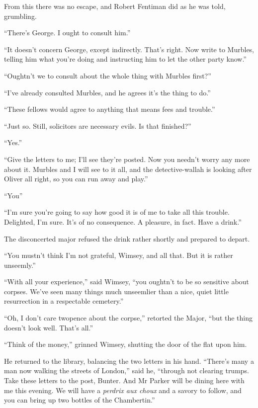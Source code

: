 From this there was no escape, and Robert Fentiman did as he was told, grumbling.

\enquote{There's George. I ought to consult him.}

\enquote{It doesn't concern George, except indirectly. That's right. Now write to Murbles, telling him what you're doing and instructing him to let the other party know.}

\enquote{Oughtn't we to consult about the whole thing with Murbles first?}

\enquote{I've already consulted Murbles, and he agrees it's the thing to do.}

\enquote{These fellows would agree to anything that means fees and trouble.}

\enquote{Just so. Still, solicitors are necessary evils. Is that finished?}

\enquote{Yes.}

\enquote{Give the letters to me; I'll see they're posted. Now you needn't worry any more about it. Murbles and I will see to it all, and the detective-wallah is looking after Oliver all right, so you can run away and play.}

\enquote{You\longdash}

\enquote{I'm sure you're going to say how good it is of me to take all this trouble. Delighted, I'm sure. It's of no consequence. A pleasure, in fact. Have a drink.}

The disconcerted major refused the drink rather shortly and prepared to depart.

\enquote{You mustn't think I'm not grateful, Wimsey, and all that. But it is rather unseemly.}

\enquote{With all your experience,} said Wimsey, \enquote{you oughtn't to be so sensitive about corpses. We've seen many things much unseemlier than a nice, quiet little resurrection in a respectable cemetery.}

\enquote{Oh, I don't care twopence about the corpse,} retorted the Major, \enquote{but the thing doesn't look well. That's all.}

\enquote{Think of the money,} grinned Wimsey, shutting the door of the flat upon him.

He returned to the library, balancing the two letters in his hand. \enquote{There's many a man now walking the streets of London,} said he, \enquote{through not clearing trumps. Take these letters to the post, Bunter. And Mr Parker will be dining here with me this evening. We will have a \textit{perdrix aux choux} and a savory to follow, and you can bring up two bottles of the Chambertin.}

